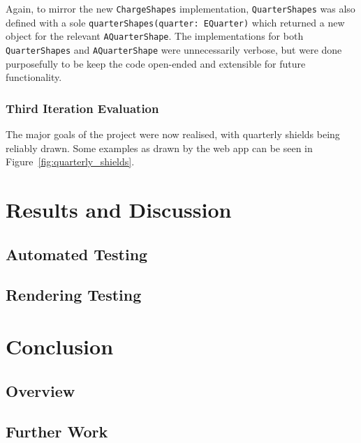 \documentclass[nobib, a4paper, twoside, justified]{tufte-book}
\begin{document}
Again, to mirror the new \texttt{ChargeShapes} implementation, \texttt{QuarterShapes} was also
defined with a sole \texttt{quarterShapes(quarter: EQuarter)} which returned a new object for the
relevant \texttt{AQuarterShape}. The implementations for both \texttt{QuarterShapes} and
\texttt{AQuarterShape} were unnecessarily verbose, but were done purposefully to be keep the code
open-ended and extensible for future functionality.

\subsection{Third Iteration Evaluation}%
\label{sub:third_iteration_evaluation}

The major goals of the project were now realised, with quarterly shields being reliably drawn. Some
examples as drawn by the web app can be seen in Figure~\ref{fig:quarterly_shields}.

\begin{figure*}[h]
  \qquad
  \caption{Some quarterly examples drawn by the web app.}%
  \label{fig:quarterly_shields}
\end{figure*}

\chapter{Results and Discussion}%
\label{cha:results_and_discussion}

\section{Automated Testing}%
\label{sec:automated_testing}

\section{Rendering Testing}%
\label{sec:rendering_testing}

\chapter{Conclusion}%
\label{cha:conclusion}

\section{Overview}%
\label{sec:overview}

\section{Further Work}%
\label{sec:further_work}



\backmatter%

\printbibliography[heading=bibintoc]

\printglossary%


\end{document}
